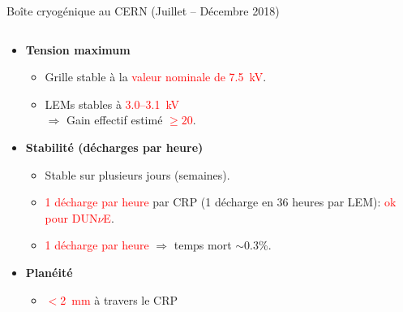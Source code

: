 \begin{frame}{Boîte cryogénique au CERN (Juillet -- Décembre 2018)}
\begin{columns}
\begin{column}{0.6\textwidth}
\begin{scriptsize}
	    			\begin{itemize}
	    				\item \textbf{Tension maximum}
	    				\begin{itemize}
	    					\item Grille stable à la \textcolor{red}{valeur nominale de \SI{7.5}{\kilo\volt}}.
	    					\item LEMs stables à \textcolor{red}{3.0--\SI{3.1}{\kilo\volt}}\\
				    					$\Rightarrow$ Gain effectif estimé \textcolor{red}{$\geq 20$}.
	    				\end{itemize}
	    				\item \textbf{Stabilité (décharges par heure)}
	    				\begin{itemize}
	    					\item Stable sur plusieurs jours (semaines).
	    					\item \textcolor{red}{1 décharge par heure} par CRP (1 décharge en 36 heures par LEM): \textcolor{red}{ok pour DUN$\nu$E}.
	    					\item \textcolor{red}{1 décharge par heure} $\Rightarrow$ temps mort $\sim$0.3\%.
	    				\end{itemize}
	    				\item \textbf{Planéité}
	    				\begin{itemize}
	    					\item \textcolor{red}{$<$\SI{2}{\milli\meter}} à travers le CRP %
	    				\end{itemize}
	    			\end{itemize}
	    		\end{scriptsize}
    		\end{column}
    	\end{columns}
	    \end{frame}


